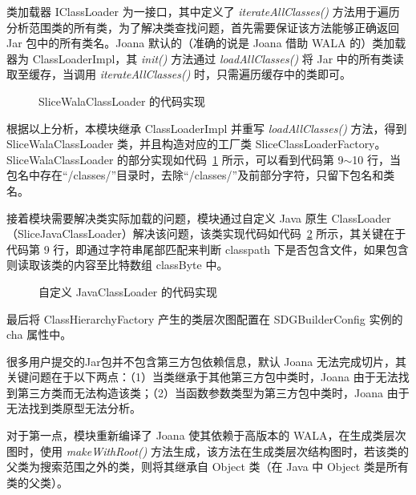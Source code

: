 类加载器 IClassLoader 为一接口，其中定义了 \textit{iterateAllClasses()} 方法用于遍历分析范围类的所有类，为了解决类查找问题，首先需要保证该方法能够正确返回 Jar 包中的所有类名。Joana 默认的（准确的说是 Joana 借助 WALA 的）类加载器为 ClassLoaderImpl，其 \textit{init()} 方法通过 \textit{loadAllClasses()} 将 Jar 中的所有类读取至缓存，当调用 \textit{iterateAllClasses()} 时，只需遍历缓存中的类即可。

\begin{figure}[htbp]
    \centering
    \begin{minipage}{0.9\textwidth}
        
    \end{minipage}
    \caption{SliceWalaClassLoader 的代码实现}\label{code:sliceWalaClassLoader}
    \vspace{-0.5cm}
\end{figure}

根据以上分析，本模块继承 ClassLoaderImpl 并重写 \textit{loadAllClasses()} 方法，得到 SliceWalaClassLoader 类，并且构造对应的工厂类 SliceClassLoaderFactory。SliceWalaClassLoader 的部分实现如代码~\ref{code:sliceWalaClassLoader} 所示，可以看到代码第 9$\sim$10 行，当包名中存在“/classes/”目录时，去除“/classes/”及前部分字符，只留下包名和类名。


接着模块需要解决类实际加载的问题，模块通过自定义 Java 原生 ClassLoader（SliceJavaClassLoader）解决该问题，该类实现代码如代码~\ref{code:sliceJavaClassLoader} 所示，其关键在于代码第 9 行，即通过字符串尾部匹配来判断 classpath 下是否包含文件，如果包含则读取该类的内容至比特数组 classByte 中。 

\begin{figure}[htbp]
    \centering
    \begin{minipage}{0.9\textwidth}
        
    \end{minipage}
    \caption{自定义 JavaClassLoader 的代码实现}\label{code:sliceJavaClassLoader}
\end{figure}

最后将 ClassHierarchyFactory 产生的类层次图配置在 SDGBuilderConfig 实例的 cha 属性中。

很多用户提交的Jar包并不包含第三方包依赖信息，默认 Joana 无法完成切片，其关键问题在于以下两点：（1）当类继承于其他第三方包中类时，Joana 由于无法找到第三方类而无法构造该类；（2）当函数参数类型为第三方包中类时，Joana 由于无法找到类原型无法分析。

对于第一点，模块重新编译了 Joana 使其依赖于高版本的 WALA，在生成类层次图时，使用 \textit{makeWithRoot()} 方法生成，该方法在生成类层次结构图时，若该类的父类为搜索范围之外的类，则将其继承自 Object 类（在 Java 中 Object 类是所有类的父类）。


